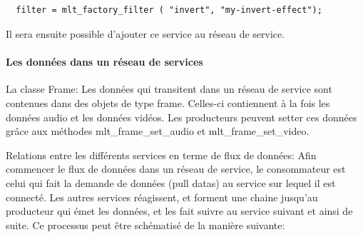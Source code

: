 \subparagraph{}

\begin{lstlisting}
  filter = mlt_factory_filter ( "invert", "my-invert-effect");
\end{lstlisting}

Il sera ensuite possible d'ajouter ce service au réseau de service.

\paragraph{Les données dans un réseau de services}

La classe Frame: Les données qui transitent dans un réseau de service
sont contenues dans des objets de type frame. Celles-ci contiennent
à la fois les données audio et les données vidéos. Les producteurs
peuvent setter ces données grâce aux méthodes mlt\_frame\_set\_audio
et mlt\_frame\_set\_video.

Relations entre les différents services en terme de flux de données:
Afin commencer le flux de données dans un réseau de service, le
consommateur est celui qui fait la demande de données (pull datas) au
service sur lequel il est connecté. Les autres services réagissent,
et forment une chaine jusqu'au producteur qui émet les données, et
les fait suivre au service suivant et ainsi de suite. Ce processus peut
être schématisé de la manière suivante:

